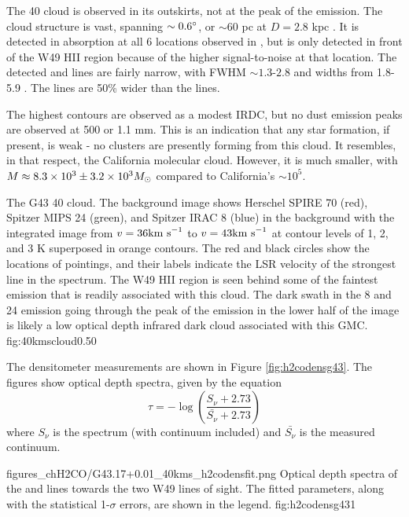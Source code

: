 The 40 \kms cloud is observed in its outskirts, not at the peak of the
\thirteenco emission.  The cloud structure is vast, spanning $\sim0.6^{\circ}$, 
or $\sim60$ pc at $D=2.8$ kpc \citep{Roman-Duval2009}.  It is detected in \oneone
absorption at all 6 locations observed in \formaldehyde, but \twotwo is only
detected in front of the W49 HII region because of the higher signal-to-noise at
that location.  The detected \thirteenco and \formaldehyde lines are fairly
narrow, with \formaldehyde FWHM $\sim1.3$-$2.8$ \kms and \thirteenco widths
from 1.8-5.9 \kms.  The \thirteenco lines are 50\% wider than the \formaldehyde
lines.

The highest \thirteenco contours are observed as a modest IRDC, but no dust
emission peaks are observed at 500 \um or 1.1 mm.  This is an indication that
any star formation, if present, is weak - no clusters are presently forming
from this cloud.   It resembles, in that respect, the California molecular
cloud.  However, it is much smaller, with $M\approx8.3\times10^{3}\pm3.2\times10^{3} M_{\odot}$
compared to California's $\sim10^5$.

{The G43 40 \kms cloud.  The background image shows Herschel SPIRE 70 \um (red),
Spitzer MIPS 24 \um (green), and Spitzer IRAC 8 \um (blue) in the background with
the \thirteenco integrated image from $v=36 \textrm{km~s}^{-1}$ to $v=43 \textrm{km~s}^{-1}$ at contour levels of
1, 2, and 3 K superposed in orange contours.  The red and black circles
show the locations of \formaldehyde pointings, and their labels indicate the LSR velocity
of the strongest line in the spectrum.  The W49 HII region is seen
behind some of the faintest \thirteenco emission that is readily associated
with this cloud.  The dark swath in the 8 and 24 \um emission going through the
peak of the \thirteenco emission in the lower half of the image is likely a low
optical depth infrared dark cloud associated with this GMC.}
{fig:40kmscloud}{0.5}{0}

The \formaldehyde densitometer measurements are shown in Figure \ref{fig:h2codensg43}.
The figures show optical depth spectra, given by the equation
$$\tau = -\log\left(\frac{S_\nu + 2.73}{\bar{S_\nu} + 2.73}\right)$$
where $S_\nu$ is the spectrum (with continuum included) and $\bar{S_\nu}$ is
the measured continuum.

{figures_chH2CO/G43.17+0.01_40kms_h2codensfit.png}
{Optical depth spectra of the \oneone and \twotwo lines towards the two W49 lines
of sight.  The fitted parameters, along with the statistical 1-$\sigma$ errors,
are shown in the legend.}
{fig:h2codensg43}{1}

